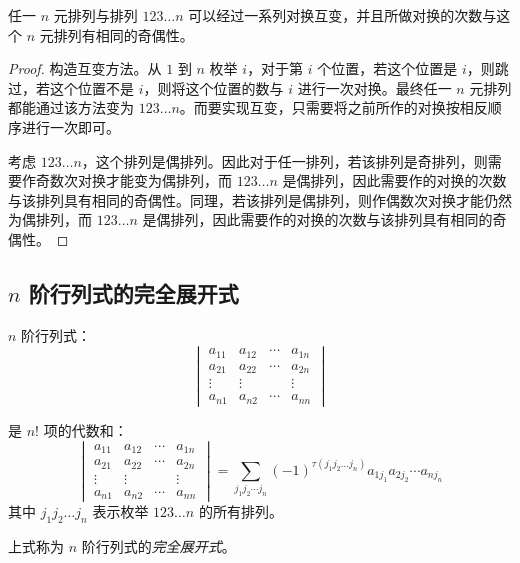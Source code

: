 \begin{theorem}
	任一 $n$ 元排列与排列 $123 \ldots n$ 可以经过一系列对换互变，并且所做对换的次数与这个 $n$ 元排列有相同的奇偶性。
\end{theorem}

\begin{proof}
	构造互变方法。从 $1$ 到 $n$ 枚举 $i$，对于第 $i$ 个位置，若这个位置是 $i$，则跳过，若这个位置不是 $i$，则将这个位置的数与 $i$ 进行一次对换。最终任一 $n$ 元排列都能通过该方法变为 $123 \ldots n$。而要实现互变，只需要将之前所作的对换按相反顺序进行一次即可。

	考虑 $123 \ldots n$，这个排列是偶排列。因此对于任一排列，若该排列是奇排列，则需要作奇数次对换才能变为偶排列，而 $123 \ldots n$ 是偶排列，因此需要作的对换的次数与该排列具有相同的奇偶性。同理，若该排列是偶排列，则作偶数次对换才能仍然为偶排列，而 $123 \ldots n$ 是偶排列，因此需要作的对换的次数与该排列具有相同的奇偶性。
\end{proof}

\subsection{$n$ 阶行列式的完全展开式}

\begin{theorem}[行列式的完全展开式]
	$n$ 阶行列式：
	$$
	\begin{vmatrix}
		a_{11} & a_{12} & \cdots & a_{1n}
		\\
		a_{21} & a_{22} & \cdots & a_{2n}
		\\
		\vdots & \vdots &  & \vdots
		\\
		a_{n1} & a_{n2} & \cdots & a_{nn}
		\end{vmatrix}
	$$

	是 $n!$ 项的代数和：
	$$
	\begin{vmatrix}
		a_{11} & a_{12} & \cdots & a_{1n}
		\\
		a_{21} & a_{22} & \cdots & a_{2n}
		\\
		\vdots & \vdots &  & \vdots
		\\
		a_{n1} & a_{n2} & \cdots & a_{nn}
		\end{vmatrix} =
		\sum_{j_1 j_2 \cdots j_n} (-1)^{\tau(j_1 j_2 \ldots j_n)} a_{1j_1} a_{2j_2} \cdots a_{nj_n}
	$$
	其中 $j_1 j_2 \ldots j_n$ 表示枚举 $123 \ldots n$ 的所有排列。

	上式称为 $n$ 阶行列式的\emph{完全展开式}。
\end{theorem}

